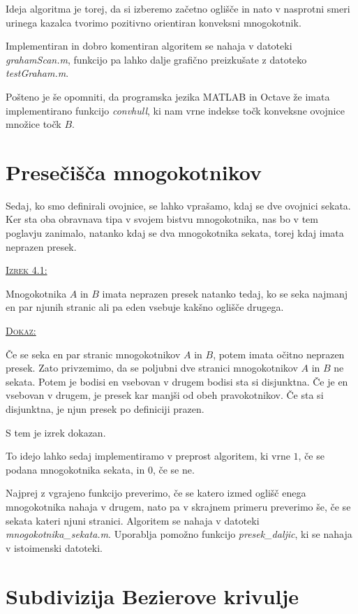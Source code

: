 \documentclass[a4paper, 12pt]{article} %
\newenvironment{matematika}[1]{
{\underline{\textsc{#1:}}}
}{
}
\begin{document}
Ideja algoritma je torej, da si izberemo začetno oglišče in nato v nasprotni smeri urinega kazalca tvorimo pozitivno orientiran konveksni mnogokotnik.

Implementiran in dobro komentiran algoritem se nahaja v datoteki \emph{grahamScan.m}, funkcijo pa lahko dalje grafično preizkušate z datoteko \emph{testGraham.m}.

Pošteno je še opomniti, da programska jezika MATLAB in Octave že imata implementirano funkcijo \emph{convhull}, ki nam vrne indekse točk konveksne ovojnice množice točk $B$.

\section{Presečišča mnogokotnikov}

Sedaj, ko smo definirali ovojnice, se lahko vprašamo, kdaj se dve ovojnici sekata. Ker sta oba obravnava tipa v svojem bistvu mnogokotnika, nas bo v tem poglavju zanimalo, natanko kdaj se dva mnogokotnika sekata, torej kdaj imata neprazen presek.

\begin{matematika}{Izrek 4.1}
Mnogokotnika $A$ in $B$ imata neprazen presek natanko tedaj, ko se seka najmanj en par njunih stranic ali pa eden vsebuje kakšno oglišče drugega.
\end{matematika}

\begin{matematika}{Dokaz}
Če se seka en par stranic mnogokotnikov $A$ in $B$, potem imata očitno neprazen presek.
Zato privzemimo, da se poljubni dve stranici mnogokotnikov $A$ in $B$ ne sekata. Potem je bodisi en vsebovan v drugem bodisi sta si disjunktna. Če je en vsebovan v drugem, je presek kar manjši od obeh pravokotnikov. Če sta si disjunktna, je njun presek po definiciji prazen.

S tem je izrek dokazan.
\end{matematika}

To idejo lahko sedaj implementiramo v preprost algoritem, ki vrne $1$, če se podana mnogokotnika sekata, in $0$, če se ne.

Najprej z vgrajeno funkcijo preverimo, če se katero izmed oglišč enega mnogokotnika nahaja v drugem, nato pa v skrajnem primeru preverimo še, če se sekata kateri njuni stranici. Algoritem se nahaja v datoteki \emph{mnogokotnika\_sekata.m}. Uporablja pomožno funkcijo \emph{presek\_daljic}, ki se nahaja v istoimenski datoteki.

\section{Subdivizija Bezierove krivulje}
\end{document}
